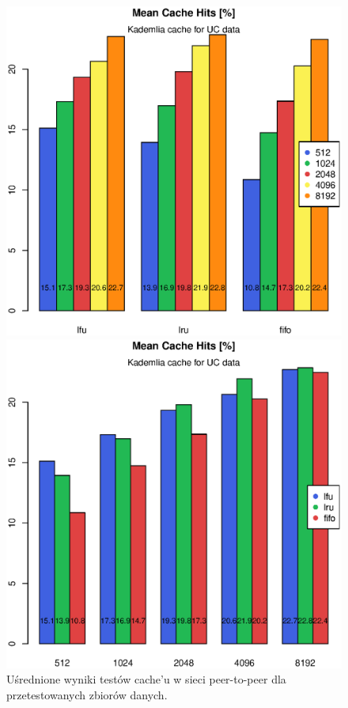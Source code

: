 \documentclass[a4paper,11pt]{scrartcl}
\newcommand{\s}{ }
\newcommand{\keszu}{cache'u}
\begin{document}
\begin{figure}[h!]
\begin{minipage}{0.48\linewidth}
\centering
\includegraphics[width=0.9\linewidth]{img/tests/p2p_mean_uc_1.eps}
\end{minipage}
\begin{minipage}{0.48\linewidth}
\centering
\includegraphics[width=0.9\linewidth]{img/tests/p2p_mean_uc_2.eps}
\end{minipage}
\caption{Uśrednione wyniki testów \keszu\s w sieci peer-to-peer dla przetestowanych zbiorów danych.}
\label{fig_tests_p2p_mean}
\end{figure}
\end{document}
